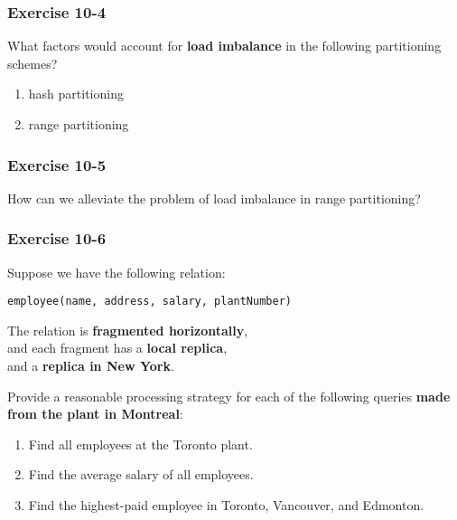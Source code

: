 \begin{frame}
\frametitle{Exercise 10-4}

What factors would account for \textbf{load imbalance} in the following partitioning schemes?

\begin{enumerate}
  \item hash partitioning
  \item range partitioning
\end{enumerate}

\end{frame}


\begin{frame}
\frametitle{Exercise 10-5}

How can we alleviate the problem of load imbalance in range partitioning?

\end{frame}


\begin{frame}
\frametitle{Exercise 10-6}

Suppose we have the following relation: \\
\begin{center}
  \texttt{employee(name, address, salary, plantNumber)}
\end{center}

The relation is \textbf{fragmented horizontally}, \\
and each fragment has a \textbf{local replica}, \\
and a \textbf{replica in New York}.

Provide a reasonable processing strategy for each of the following queries \textbf{made from the plant in Montreal}:

\begin{enumerate}
  \item Find all employees at the Toronto plant.
  \item Find the average salary of all employees.
  \item Find the highest-paid employee in Toronto, Vancouver, and Edmonton.
\end{enumerate}

\end{frame}


